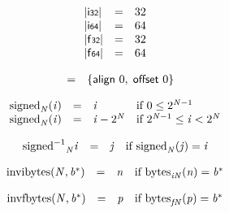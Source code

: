 $$
\begin{array}{@{}lcl@{}l@{}}
{|\mathsf{i{\scriptstyle32}}|} &=& 32 &  \\
{|\mathsf{i{\scriptstyle64}}|} &=& 64 &  \\
{|\mathsf{f{\scriptstyle32}}|} &=& 32 &  \\
{|\mathsf{f{\scriptstyle64}}|} &=& 64 &  \\
\end{array}
$$

\vspace{1ex}

\vspace{1ex}

$$
\begin{array}{@{}lcl@{}l@{}}
 &=& \{ \begin{array}[t]{@{}l@{}}
\mathsf{align}~0,\; \mathsf{offset}~0 \}\end{array} &  \\
\end{array}
$$

\vspace{1ex}

$$
\begin{array}{@{}lcl@{}l@{}}
{{\mathrm{signed}}}_{{\mathit{N}}}({\mathit{i}}) &=& {\mathit{i}} &\quad
  \mbox{if}~0 \leq {2^{{\mathit{N}} - 1}} \\
{{\mathrm{signed}}}_{{\mathit{N}}}({\mathit{i}}) &=& {\mathit{i}} - {2^{{\mathit{N}}}} &\quad
  \mbox{if}~{2^{{\mathit{N}} - 1}} \leq {\mathit{i}} < {2^{{\mathit{N}}}} \\
\end{array}
$$

$$
\begin{array}{@{}lcl@{}l@{}}
{{{{{\mathrm{signed}}^{{-1}}}}{}}_{{\mathit{N}}}}{{{\mathit{i}}}} &=& {\mathit{j}} &\quad
  \mbox{if}~{{\mathrm{signed}}}_{{\mathit{N}}}({\mathit{j}}) = {{\mathit{i}}} \\
\end{array}
$$

\vspace{1ex}

$$
\begin{array}{@{}lcl@{}l@{}}
{\mathrm{invibytes}}({\mathit{N}}, {{\mathit{b}}^\ast}) &=& {\mathit{n}} &\quad
  \mbox{if}~{{\mathrm{bytes}}}_{{{\mathit{i}}}{{\mathit{N}}}}({\mathit{n}}) = {{\mathit{b}}^\ast} \\
\end{array}
$$

$$
\begin{array}{@{}lcl@{}l@{}}
{\mathrm{invfbytes}}({\mathit{N}}, {{\mathit{b}}^\ast}) &=& {\mathit{p}} &\quad
  \mbox{if}~{{\mathrm{bytes}}}_{{{\mathit{f}}}{{\mathit{N}}}}({\mathit{p}}) = {{\mathit{b}}^\ast} \\
\end{array}
$$

